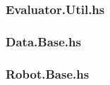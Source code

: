 \documentclass[a4paper,10pt]{article}
\begin{document}
\subsubsection{Evaluator.Util.hs}

\subsubsection{Data.Base.hs}

\subsubsection{Robot.Base.hs}

\restoregeometry
\end{document}
